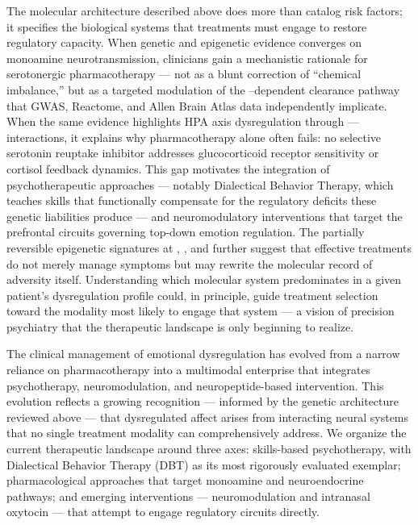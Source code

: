 \bigskip

The molecular architecture described above does more than catalog risk factors;
it specifies the biological systems that treatments must engage to restore
regulatory capacity.
When genetic and epigenetic evidence converges on monoamine neurotransmission,
clinicians gain a mechanistic rationale for serotonergic pharmacotherapy — not
as a blunt correction of ``chemical imbalance,'' but as a targeted modulation
of the --dependent clearance pathway that GWAS, Reactome, and
Allen Brain Atlas data independently implicate.\cite{uniprot2023,gillespie2022,hawrylycz2012}
When the same evidence highlights HPA axis dysregulation through
---- interactions, it explains why
pharmacotherapy alone often fails: no selective serotonin reuptake inhibitor
addresses glucocorticoid receptor sensitivity or cortisol feedback dynamics.
This gap motivates the integration of psychotherapeutic approaches — notably
Dialectical Behavior Therapy, which teaches skills that functionally compensate
for the regulatory deficits these genetic liabilities produce — and
neuromodulatory interventions that target the prefrontal circuits governing
top-down emotion regulation.\cite{kredlow2021}
The partially reversible epigenetic signatures at , ,
and  further suggest that effective treatments do not merely manage
symptoms but may rewrite the molecular record of adversity itself.
Understanding which molecular system predominates in a given patient's
dysregulation profile could, in principle, guide treatment selection toward the
modality most likely to engage that system — a vision of precision psychiatry
that the therapeutic landscape is only beginning to realize.




The clinical management of emotional dysregulation has evolved from a narrow
reliance on pharmacotherapy into a multimodal enterprise that integrates
psychotherapy, neuromodulation, and neuropeptide-based intervention.\cite{daros2019}
This evolution reflects a growing recognition — informed by the genetic
architecture reviewed above — that dysregulated affect arises from
interacting neural systems that no single treatment modality can
comprehensively address.
We organize the current therapeutic landscape around three axes:
skills-based psychotherapy, with Dialectical Behavior Therapy (DBT) as its
most rigorously evaluated exemplar; pharmacological approaches that target
monoamine and neuroendocrine pathways; and emerging interventions —
neuromodulation and intranasal oxytocin — that attempt to engage regulatory
circuits directly.

